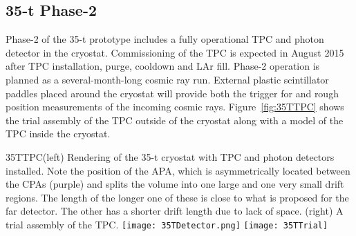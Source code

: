 \subsection{35-t Phase-2}

Phase-2 of the 35-t prototype includes a fully operational TPC and
photon detector in the cryostat.  Commissioning of the TPC is expected
in August 2015 after TPC installation, purge, cooldown and LAr fill.
Phase-2 operation is planned as a several-month-long cosmic ray run.
External plastic scintillator paddles placed around the cryostat will
provide both the trigger for and rough position measurements of the
incoming cosmic rays.  Figure~\ref{fig:35TTPC} shows the trial
assembly of the TPC outside of the cryostat along with a model of the
TPC inside the cryostat.
\begin{cdrfigure}{35TTPC}{(left) Rendering of the
35-t cryostat with TPC and photon detectors installed. 
Note the position of the APA, which is asymmetrically located between the CPAs (purple) and
splits the volume into one large and one very small %
drift regions.
The length of the longer one of these is close to what is proposed for the far detector.
The other has a shorter drift length due to lack of space.
(right) A trial assembly of the TPC.
}
\texttt{[image: 35TDetector.png]}
\texttt{[image: 35TTrial]}
\end{cdrfigure}

